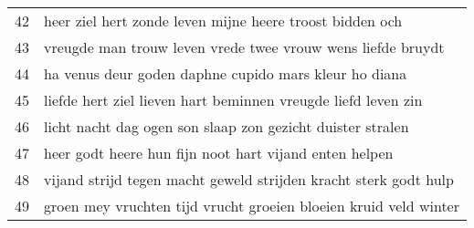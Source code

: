 \begin{longtable}{p{} | p{}}
	42    & heer ziel hert zonde leven mijne heere troost bidden och          \\
	43    & vreugde man trouw leven vrede twee vrouw wens liefde bruydt       \\
	44    & ha venus deur goden daphne cupido mars kleur ho diana             \\
	45    & liefde hert ziel lieven hart beminnen vreugde liefd leven zin     \\
	46    & licht nacht dag ogen son slaap zon gezicht duister stralen        \\
	47    & heer godt heere hun fijn noot hart vijand enten helpen            \\
	48    & vijand strijd tegen macht geweld strijden kracht sterk godt hulp  \\
	49    & groen mey vruchten tijd vrucht groeien bloeien kruid veld winter\\
	\bottomrule
\end{longtable}